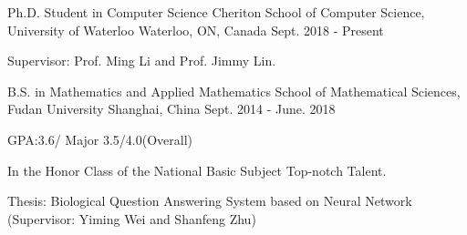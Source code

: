 

\begin{cventries}

 \cventry
    {Ph.D. Student in Computer Science} %
    {Cheriton School of Computer Science, University of Waterloo} %
    {Waterloo, ON, Canada} %
    {Sept. 2018 - Present} %
    {
      \begin{cvitems} %
        \item {Supervisor: Prof. Ming Li and Prof. Jimmy Lin.}
      \end{cvitems}
    }
      \cventry
    {B.S. in Mathematics and Applied Mathematics} %
    {School of Mathematical Sciences, Fudan University} %
    {Shanghai, China} %
    {Sept. 2014 - June. 2018} %
    {
      \begin{cvitems} %
      \item{GPA:3.6/ Major 3.5/4.0(Overall)}
      \item {In the Honor Class of the National Basic Subject Top-notch Talent.}
      \item{Thesis: Biological Question Answering System based on Neural Network (Supervisor: Yiming Wei and Shanfeng Zhu)}
      \end{cvitems}
    }

\end{cventries}
